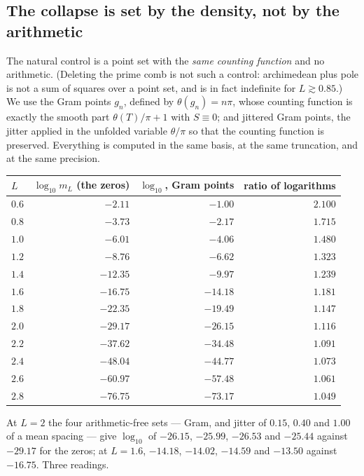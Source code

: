 \subsection{The collapse is set by the density, not by the arithmetic}
\label{subsec:density}

The natural control is a point set with the \emph{same counting function} and no
arithmetic. (Deleting the prime comb is not such a control: archimedean plus pole
is not a sum of squares over a point set, and is in fact indefinite for
$L\gtrsim0.85$.) We use the Gram points $g_n$, defined by $\theta(g_n)=n\pi$,
whose counting function is exactly the smooth part $\theta(T)/\pi+1$ with
$S\equiv0$; and jittered Gram points, the jitter applied in the unfolded variable
$\theta/\pi$ so that the counting function is preserved. Everything is computed in
the same basis, at the same truncation, and at the same precision.

\begin{center}
\begin{tabular}{@{}lrrr@{}}
\toprule
$L$ & $\log_{10}m_L$ (the zeros) & $\log_{10}$, Gram points & ratio of logarithms\\
\midrule
$0.6$ & $-2.11$ & $-1.00$ & $2.100$\\
$0.8$ & $-3.73$ & $-2.17$ & $1.715$\\
$1.0$ & $-6.01$ & $-4.06$ & $1.480$\\
$1.2$ & $-8.76$ & $-6.62$ & $1.323$\\
$1.4$ & $-12.35$ & $-9.97$ & $1.239$\\
$1.6$ & $-16.75$ & $-14.18$ & $1.181$\\
$1.8$ & $-22.35$ & $-19.49$ & $1.147$\\
$2.0$ & $-29.17$ & $-26.15$ & $1.116$\\
$2.2$ & $-37.62$ & $-34.48$ & $1.091$\\
$2.4$ & $-48.04$ & $-44.77$ & $1.073$\\
$2.6$ & $-60.97$ & $-57.48$ & $1.061$\\
$2.8$ & $-76.75$ & $-73.17$ & $1.049$\\
\bottomrule
\end{tabular}
\end{center}

At $L=2$ the four arithmetic-free sets --- Gram, and jitter of $0.15$, $0.40$ and
$1.00$ of a mean spacing --- give $\log_{10}$ of $-26.15$, $-25.99$, $-26.53$ and
$-25.44$ against $-29.17$ for the zeros; at $L=1.6$, $-14.18$, $-14.02$, $-14.59$
and $-13.50$ against $-16.75$. Three readings.

